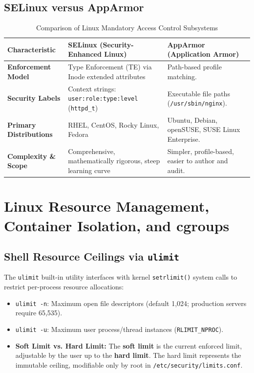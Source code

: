 \subsection{SELinux versus AppArmor}
\begin{table}[htbp]
\centering
\small
\caption{Comparison of Linux Mandatory Access Control Subsystems}
\label{tab:selinux_vs_apparmor}
\begin{tabularx}{\textwidth}{l p{5cm} X}
\toprule
\textbf{Characteristic} & \textbf{SELinux (Security-Enhanced Linux)} & \textbf{AppArmor (Application Armor)} \\
\midrule
\textbf{Enforcement Model} & Type Enforcement (TE) via Inode extended attributes & Path-based profile matching. \\
\textbf{Security Labels} & Context strings: \texttt{user:role:type:level} (\texttt{httpd\_t}) & Executable file paths (\texttt{/usr/sbin/nginx}). \\
\textbf{Primary Distributions} & RHEL, CentOS, Rocky Linux, Fedora & Ubuntu, Debian, openSUSE, SUSE Linux Enterprise. \\
\textbf{Complexity \& Scope} & Comprehensive, mathematically rigorous, steep learning curve & Simpler, profile-based, easier to author and audit. \\
\bottomrule
\end{tabularx}
\end{table}

\section{Linux Resource Management, Container Isolation, and cgroups}
\label{sec:os_cgroups_containers}

\subsection{Shell Resource Ceilings via \texttt{ulimit}}
The \texttt{ulimit} built-in utility interfaces with kernel \texttt{setrlimit()} system calls to restrict per-process resource allocations:
\begin{itemize}
    \item \texttt{ulimit -n}: Maximum open file descriptors (default 1,024; production servers require 65,535).
    \item \texttt{ulimit -u}: Maximum user process/thread instances (\texttt{RLIMIT\_NPROC}).
    \item \textbf{Soft Limit vs. Hard Limit:} The \textbf{soft limit} is the current enforced limit, adjustable by the user up to the \textbf{hard limit}. The hard limit represents the immutable ceiling, modifiable only by root in \texttt{/etc/security/limits.conf}.
\end{itemize}

